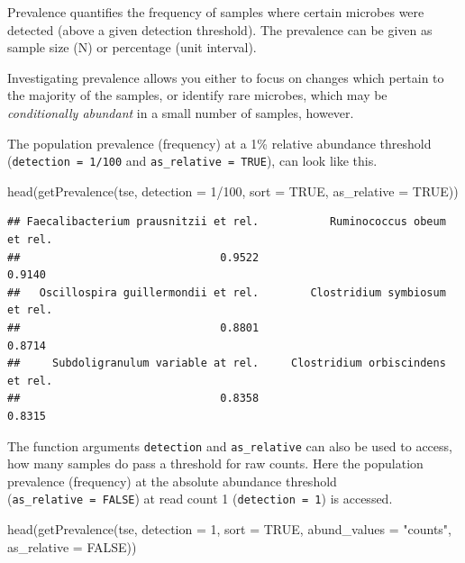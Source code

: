 \documentclass[
]{book}
\newenvironment{Shaded}{\begin{snugshade}}{\end{snugshade}}
\newcommand{\AttributeTok}[1]{\textcolor[rgb]{0.77,0.63,0.00}{#1}}
\newcommand{\ConstantTok}[1]{\textcolor[rgb]{0.00,0.00,0.00}{#1}}
\newcommand{\DecValTok}[1]{\textcolor[rgb]{0.00,0.00,0.81}{#1}}
\newcommand{\FunctionTok}[1]{\textcolor[rgb]{0.00,0.00,0.00}{#1}}
\newcommand{\NormalTok}[1]{#1}
\newcommand{\SpecialCharTok}[1]{\textcolor[rgb]{0.00,0.00,0.00}{#1}}
\newcommand{\StringTok}[1]{\textcolor[rgb]{0.31,0.60,0.02}{#1}}
\begin{document}
Prevalence quantifies the frequency of samples where certain microbes
were detected (above a given detection threshold). The prevalence can
be given as sample size (N) or percentage (unit interval).

Investigating prevalence allows you either to focus on changes which
pertain to the majority of the samples, or identify rare microbes,
which may be \emph{conditionally abundant} in a small number of samples,
however.

The population prevalence (frequency) at a 1\% relative abundance
threshold (\texttt{detection\ =\ 1/100} and \texttt{as\_relative\ =\ TRUE}), can look
like this.

\begin{Shaded}
\begin{Highlighting}[]
\FunctionTok{head}\NormalTok{(}\FunctionTok{getPrevalence}\NormalTok{(tse, }\AttributeTok{detection =} \DecValTok{1}\SpecialCharTok{/}\DecValTok{100}\NormalTok{, }\AttributeTok{sort =} \ConstantTok{TRUE}\NormalTok{, }\AttributeTok{as\_relative =} \ConstantTok{TRUE}\NormalTok{))}
\end{Highlighting}
\end{Shaded}

\begin{verbatim}
## Faecalibacterium prausnitzii et rel.           Ruminococcus obeum et rel. 
##                               0.9522                               0.9140 
##   Oscillospira guillermondii et rel.        Clostridium symbiosum et rel. 
##                               0.8801                               0.8714 
##     Subdoligranulum variable at rel.     Clostridium orbiscindens et rel. 
##                               0.8358                               0.8315
\end{verbatim}

The function arguments \texttt{detection} and \texttt{as\_relative} can also be used
to access, how many samples do pass a threshold for raw counts. Here
the population prevalence (frequency) at the absolute abundance
threshold (\texttt{as\_relative\ =\ FALSE}) at read count 1 (\texttt{detection\ =\ 1}) is
accessed.

\begin{Shaded}
\begin{Highlighting}[]
\FunctionTok{head}\NormalTok{(}\FunctionTok{getPrevalence}\NormalTok{(tse, }\AttributeTok{detection =} \DecValTok{1}\NormalTok{, }\AttributeTok{sort =} \ConstantTok{TRUE}\NormalTok{, }\AttributeTok{abund\_values =} \StringTok{"counts"}\NormalTok{,}
                   \AttributeTok{as\_relative =} \ConstantTok{FALSE}\NormalTok{))}
\end{Highlighting}
\end{Shaded}
\end{document}
